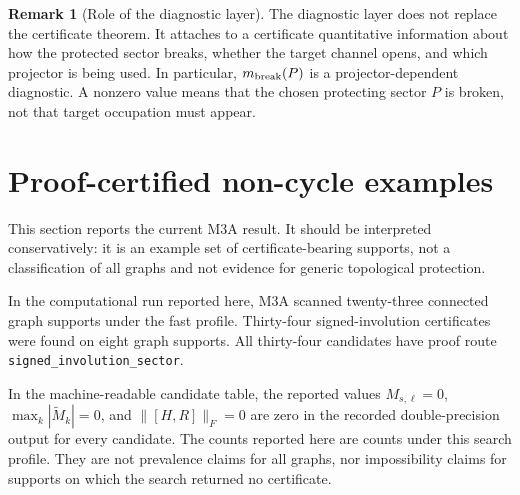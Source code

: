 \documentclass[11pt]{article}
\theoremstyle{definition}
\newtheorem{remark}[theorem]{Remark}
\begin{document}
\begin{remark}[Role of the diagnostic layer]
The diagnostic layer does not replace the certificate theorem. It attaches to a certificate quantitative information about how the protected sector breaks, whether the target channel opens, and which projector is being used. In particular, $m_{\rm break}(P)$ is a projector-dependent diagnostic. A nonzero value means that the chosen protecting sector $P$ is broken, not that target occupation must appear.
\end{remark}

\section{Proof-certified non-cycle examples}
This section reports the current M3A result. It should be interpreted conservatively: it is an example set of certificate-bearing supports, not a classification of all graphs and not evidence for generic topological protection.

In the computational run reported here, M3A scanned twenty-three connected graph supports under the fast profile. Thirty-four signed-involution certificates were found on eight graph supports. All thirty-four candidates have proof route \texttt{signed\_involution\_sector}.

In the machine-readable candidate table, the reported values $M_{s,\ell}=0$, $\max_k|\widetilde M_k|=0$, and $\|[H,R]\|_F=0$ are zero in the recorded double-precision output for every candidate. The counts reported here are counts under this search profile. They are not prevalence claims for all graphs, nor impossibility claims for supports on which the search returned no certificate.


\begin{table}[H]
\centering
\caption{M3A family classification of signed-involution exact zero-transfer certificates. The table records proof-certificate examples, not prevalence in random graph ensembles.}
\end{table}
\end{document}
